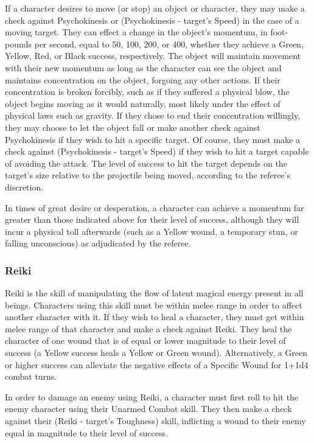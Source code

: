 \documentclass[oneside]{book}
\begin{document}
\begin{multicols}{2}
If a character desires to move (or stop) an object or character, they may make a check against Psychokinesis or (Psychokinesis - target's Speed) in the case of a moving target. They can effect a change in the object's momentum, in foot-pounds per second, equal to 50, 100, 200, or 400, whether they achieve a Green, Yellow, Red, or Black success, respectively. The object will maintain movement with their new momentum as long as the character can see the object and maintains concentration on the object, forgoing any other actions. If their concentration is broken forcibly, such as if they suffered a physical blow, the object begins moving as it would naturally, most likely under the effect of physical laws such as gravity. If they chose to end their concentration willingly, they may choose to let the object fall or make another check against Psychokinesis if they wish to hit a specific target. Of course, they must make a check against (Psychokinesis - target's Speed) if they wish to hit a target capable of avoiding the attack. The level of success to hit the target depends on the target's size relative to the projectile being moved, according to the referee's discretion. 

In times of great desire or desperation, a character can achieve a momentum far greater than those indicated above for their level of success, although they will incur a physical toll afterwards (such as a Yellow wound, a temporary stun, or falling unconscious) as adjudicated by the referee.

\subsubsection{Reiki}
Reiki is the skill of manipulating the flow of latent magical energy present in all beings. Characters using this skill must be within melee range in order to affect another character with it. If they wish to heal a character, they must get within melee range of that character and make a check against Reiki. They heal the character of one wound that is of equal or lower magnitude to their level of success (a Yellow success heals a Yellow or Green wound). Alternatively, a Green or higher success can alleviate the negative effects of a Specific Wound for 1+1d4 combat turns. 

In order to damage an enemy using Reiki, a character must first roll to hit the enemy character using their Unarmed Combat skill. They then make a check against their (Reiki - target's Toughness) skill, inflicting a wound to their enemy equal in magnitude to their level of success. 


\end{multicols}
\end{document}
